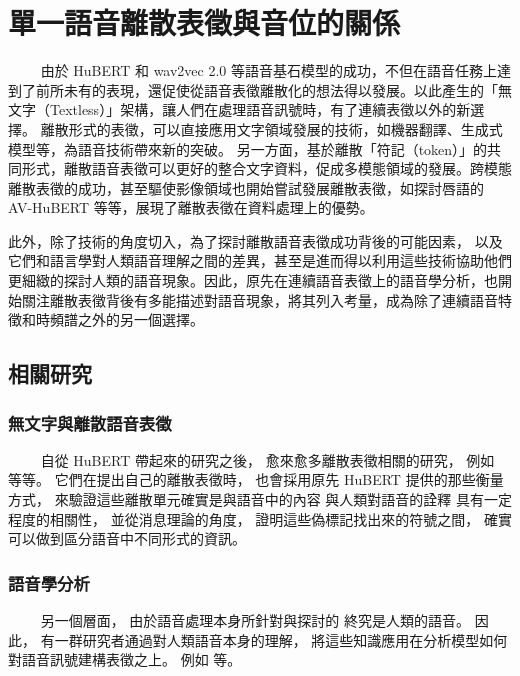 
\chapter{單一語音離散表徵與音位的關係}  %
　　
由於 HuBERT 和 wav2vec 2.0 等語音基石模型的成功，不但在語音任務上達到了前所未有的表現，還促使從語音表徵離散化的想法得以發展。以此產生的「無文字（Textless）」架構，讓人們在處理語音訊號時，有了連續表徵以外的新選擇。
離散形式的表徵，可以直接應用文字領域發展的技術，如機器翻譯、生成式模型等，為語音技術帶來新的突破。
另一方面，基於離散「符記（token）」的共同形式，離散語音表徵可以更好的整合文字資料，促成多模態領域的發展。跨模態離散表徵的成功，甚至驅使影像領域也開始嘗試發展離散表徵，如探討唇語的 AV-HuBERT \cite{shi2021learning} 等等，展現了離散表徵在資料處理上的優勢。  %

此外，除了技術的角度切入，為了探討離散語音表徵成功背後的可能因素，
以及它們和語言學對人類語音理解之間的差異，甚至是進而得以利用這些技術協助他們更細緻的探討人類的語音現象。因此，原先在連續語音表徵上的語音學分析，也開始關注離散表徵背後有多能描述對語音現象，將其列入考量，成為除了連續語音特徵和時頻譜之外的另一個選擇。

\section{相關研究}

\subsection{無文字與離散語音表徵}
　　
自從 HuBERT 帶起來的研究之後，
愈來愈多離散表徵相關的研究，
例如  等等。
它們在提出自己的離散表徵時，
也會採用原先 HuBERT 提供的那些衡量方式，
來驗證這些離散單元確實是與語音中的內容
與人類對語音的詮釋
具有一定程度的相關性，
並從消息理論的角度，
證明這些偽標記找出來的符號之間，
確實可以做到區分語音中不同形式的資訊。

\subsection{語音學分析}
　　
另一個層面，
由於語音處理本身所針對與探討的
終究是人類的語音。
因此，
有一群研究者通過對人類語音本身的理解，
將這些知識應用在分析模型如何對語音訊號建構表徵之上。
例如   等。

